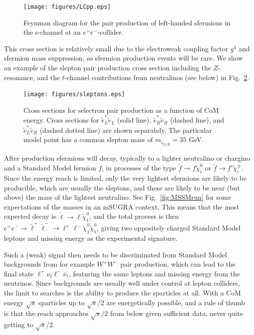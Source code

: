 \documentclass[notes.tex]{subfiles}
\begin{document}
\begin{figure}[t!]
\begin{center}
\texttt{[image: figures/LCpp.eps]} 
\caption{Feynman diagram for the pair production of left-handed sfermions in the s-channel at an  $e^+e^-$-collider.}
\label{fig:LCPP}
\end{center}
\end{figure}

This cross section is relatively small due to the electroweak coupling factor $g^4$ and sfermion mass suppression, so sfermion production events will be rare.
We show an example of the slepton pair production cross section including the $Z$-resonance, and the $t$-channel contributions from neutralinos (see below) in Fig.~\ref{fig:slepton_xsec}.

\begin{figure}[t!]
\begin{center}
\texttt{[image: figures/sleptons.eps]} 
\caption{Cross sections for selectron pair production as a function of CoM energy. Cross sections for ${\tilde e}_L^*{\tilde e}_L$ (solid line), ${\tilde e}_R^*{\tilde e}_R$ (dashed line), and ${\tilde e}_L^*{\tilde e}_R$ (dashed dotted line) are shown separately. The particular model point has a common slepton mass of $m_{\tilde e_{L/R}}=35$ GeV.}
 \label{fig:slepton_xsec}
\end{center}
\end{figure}

After production sfermions will decay, typically to a lighter neutralino or chargino and a Standard Model fermion $f$, in processes of the type $\tilde f \to f \tilde\chi_i^0$ or $\tilde f \to f' \tilde\chi_i^\pm$. Since the energy reach is limited, only the very lightest sfermions are likely to be producible, which are usually the sleptons, and these are likely to be near (but above) the mass of the lightest neutralino. See Fig.~\ref{fig:MSSMrun} for some expectations of the masses in an mSUGRA context. This means that the most expected decay is $\tilde \ell \to \ell \tilde\chi_1^0$, and  the total process is then $e^+e^-\to \tilde\ell^+\tilde\ell^- \to \ell^+\ell^- \tilde\chi^0_1\tilde\chi^0_1$, giving two oppositely charged Standard Model leptons and missing energy as the experimental signature. 

Such a (weak) signal then needs to be discriminated from Standard Model backgrounds from for example $W^+W^-$ pair production, which can lead to the final state $\ell^+\nu_\ell\ell^-\bar\nu_\ell$, featuring the same leptons and missing energy from the neutrinos. Since backgrounds are usually well under control at lepton colliders, the limit to searches is the ability to produce the sparticles at all. With a CoM energy $\sqrt{s}$ sparticles up to $\sqrt{s}/2$ are energetically possible, and a rule of thumb is that the reach approaches $\sqrt{s}/2$ from below given sufficient data, never quite  getting to $\sqrt{s}/2$.
\end{document}

